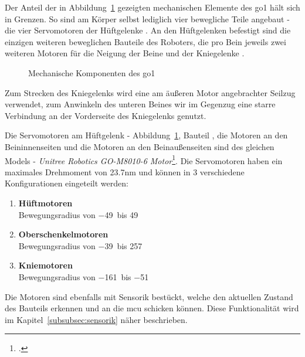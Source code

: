 Der Anteil der in Abbildung~\ref{fig:mechanische_komponenten} gezeigten mechanischen Elemente des \gls{go1} hält sich in Grenzen.
So sind am Körper selbst lediglich vier bewegliche Teile angebaut - die vier Servomotoren
der Hüftgelenke .
An den Hüftgelenken befestigt sind die einzigen weiteren beweglichen Bauteile des Roboters,
die pro Bein jeweils zwei weiteren Motoren für die Neigung der Beine  und der Kniegelenke .
\begin{figure}[h]
    \caption[Mechanische Komponenten des Go1]{Mechanische Komponenten des \gls{go1}}\label{fig:mechanische_komponenten}
\end{figure}
Zum Strecken des Kniegelenks wird eine am äußeren Motor angebrachter Seilzug  verwendet,
zum Anwinkeln des unteren Beines wir im Gegenzug eine starre Verbindung  an der Vorderseite des Kniegelenks genutzt.

Die Servomotoren am Hüftgelenk - Abbildung~\ref{fig:mechanische_komponenten}, Bauteil , die Motoren an den Beininnenseiten 
und die Motoren an den Beinaußenseiten  sind des gleichen Models -
\emph{Unitree Robotics GO-M8010-6 Motor}\footcite{go_motor}.
Die Servomotoren  haben ein maximales Drehmoment von \num{23.7}\gls{nm} und können in 3 verschiedene Konfigurationen
eingeteilt werden:
\begin{enumerate}
    \item \textbf{Hüftmotoren}\\
    Bewegungsradius von \num{-49}\textdegree~bis \num{49}\textdegree
    \item \textbf{Oberschenkelmotoren}\\
    Bewegungsradius von \num{-39}\textdegree~bis \num{257}\textdegree
    \item \textbf{Kniemotoren}\\
    Bewegungsradius von \num{-161}\textdegree~bis \num{-51}\textdegree
\end{enumerate}
Die Motoren sind ebenfalls mit Sensorik bestückt, welche den aktuellen Zustand des Bauteils erkennen und
an die \gls{mcu} schicken können.
Diese Funktionalität wird im Kapitel~\ref{subsubsec:sensorik} näher beschrieben.

